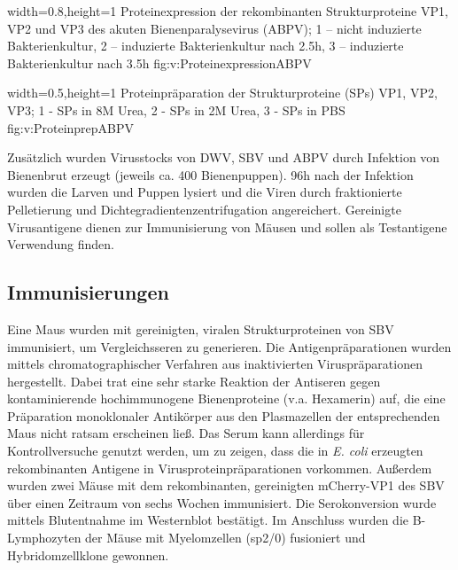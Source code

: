 {width=0.8\textwidth,height=1\textheight}
{Proteinexpression der rekombinanten Strukturproteine VP1, VP2 und VP3 des akuten Bienenparalysevirus (ABPV); 1 – nicht induzierte Bakterienkultur, 2 – induzierte Bakterienkultur nach 2.5h, 3 – induzierte Bakterienkultur nach 3.5h
}%
{}%
{fig:v:ProteinexpressionABPV}%

{width=0.5\textwidth,height=1\textheight}
{Proteinpräparation der Strukturproteine (SPs) VP1, VP2, VP3; 1 - SPs in 8M Urea, 2 - SPs in 2M Urea, 3 - SPs in PBS
}%
{}%
{fig:v:ProteinprepABPV}%

Zusätzlich wurden Virusstocks von DWV, SBV und ABPV durch Infektion von Bienenbrut erzeugt (jeweils ca. 400 Bienenpuppen). 96h nach der Infektion wurden die Larven und Puppen lysiert und die Viren durch fraktionierte Pelletierung und Dichtegradientenzentrifugation angereichert. Gereinigte Virusantigene dienen zur Immunisierung von Mäusen und sollen als Testantigene Verwendung finden. 

\subsection{Immunisierungen}
Eine Maus wurden mit gereinigten, viralen Strukturproteinen von SBV immunisiert, um Vergleichsseren zu generieren. Die Antigenpräparationen wurden mittels chromatographischer Verfahren aus inaktivierten Viruspräparationen hergestellt. Dabei trat eine sehr starke Reaktion der Antiseren gegen kontaminierende hochimmunogene Bienenproteine (v.a. Hexamerin) auf, die eine Präparation monoklonaler Antikörper aus den Plasmazellen der entsprechenden Maus nicht ratsam erscheinen ließ. Das Serum kann allerdings für Kontrollversuche genutzt werden, um zu zeigen, dass die in \textit{E. coli} erzeugten rekombinanten Antigene in Virusproteinpräparationen vorkommen. 
Außerdem wurden zwei Mäuse mit dem rekombinanten, gereinigten mCherry-VP1 des SBV über einen Zeitraum von sechs Wochen immunisiert. Die Serokonversion wurde mittels Blutentnahme im Westernblot bestätigt. Im Anschluss wurden die B-Lymphozyten der Mäuse mit Myelomzellen (sp2/0) fusioniert und Hybridomzellklone gewonnen. 

